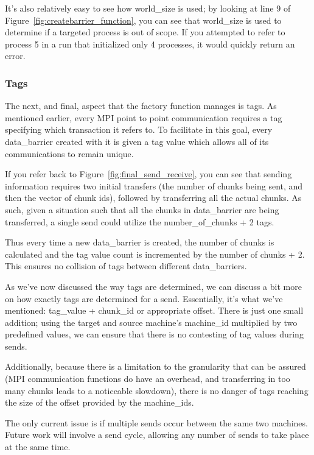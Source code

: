 \documentclass[../thesis.tex]{subfiles}
\begin{document}
        It's also relatively easy to see how world\_size is used; by looking at line 9 of Figure~\ref{fig:createbarrier_function}, you can see that world\_size is used to determine if a targeted process is out of scope. If you attempted to refer to process 5 in a run that initialized only 4 processes, it would quickly return an error.

    \subsubsection{Tags} %
    \label{ssub:tags}
        The next, and final, aspect that the factory function manages is tags. As mentioned earlier, every MPI point to point communication requires a tag specifying which transaction it refers to. To facilitate in this goal, every data\_barrier created with it is given a tag value which allows all of its communications to remain unique.

        If you refer back to Figure~\ref{fig:final_send_receive}, you can see that sending information requires two initial transfers (the number of chunks being sent, and then the vector of chunk ids), followed by transferring all the actual chunks. As such, given a situation such that all the chunks in data\_barrier are being transferred, a single send could utilize the number\_of\_chunks + 2 tags.

        Thus every time a new data\_barrier is created, the number of chunks is calculated and the tag value count is incremented by the number of chunks + 2. This ensures no collision of tags between different data\_barriers.

        As we've now discussed the way tags are determined, we can discuss a bit more on how exactly tags are determined for a send. Essentially, it's what we've mentioned: tag\_value + chunk\_id or appropriate offset. There is just one small addition; using the target and source machine's machine\_id multiplied by two predefined values, we can ensure that there is no contesting of tag values during sends. 
        
        Additionally, because there is a limitation to the granularity that can be assured (MPI communication functions do have an overhead, and transferring in too many chunks leads to a noticeable slowdown), there is no danger of tags reaching the size of the offset provided by the machine\_ids.

        The only current issue is if multiple sends occur between the same two machines. Future work will involve a send cycle, allowing any number of sends to take place at the same time.
\end{document}
